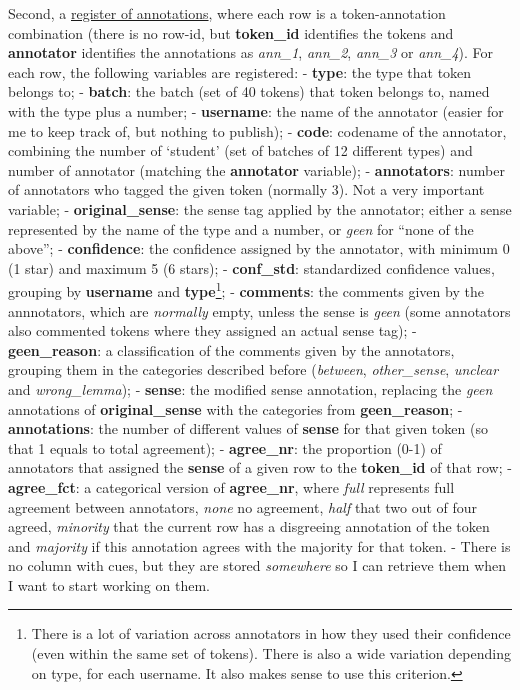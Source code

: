 \documentclass[
]{book}
\begin{document}
Second, a \href{C:/Users/u0118974/Box\%20Sync/Nederlands\%20wolken/Output/Merges/long_tokens.tsv}{register of annotations}, where each row is a token-annotation combination (there is no row-id, but \textbf{token\_id} identifies the tokens and \textbf{annotator} identifies the annotations as \emph{ann\_1}, \emph{ann\_2}, \emph{ann\_3} or \emph{ann\_4}). For each row, the following variables are registered:
- \textbf{type}: the type that token belongs to;
- \textbf{batch}: the batch (set of 40 tokens) that token belongs to, named with the type plus a number;
- \textbf{username}: the name of the annotator (easier for me to keep track of, but nothing to publish);
- \textbf{code}: codename of the annotator, combining the number of `student' (set of batches of 12 different types) and number of annotator (matching the \textbf{annotator} variable);
- \textbf{annotators}: number of annotators who tagged the given token (normally 3). Not a very important variable;
- \textbf{original\_sense}: the sense tag applied by the annotator; either a sense represented by the name of the type and a number, or \emph{geen} for ``none of the above'';
- \textbf{confidence}: the confidence assigned by the annotator, with minimum 0 (1 star) and maximum 5 (6 stars);
- \textbf{conf\_std}: standardized confidence values, grouping by \textbf{username} and \textbf{type}\footnote{There is a lot of variation across annotators in how they used their confidence (even within the same set of tokens). There is also a wide variation depending on type, for each username. It also makes sense to use this criterion.};
- \textbf{comments}: the comments given by the annnotators, which are \emph{normally} empty, unless the sense is \emph{geen} (some annotators also commented tokens where they assigned an actual sense tag);
- \textbf{geen\_reason}: a classification of the comments given by the annotators, grouping them in the categories described before (\emph{between}, \emph{other\_sense}, \emph{unclear} and \emph{wrong\_lemma});
- \textbf{sense}: the modified sense annotation, replacing the \emph{geen} annotations of \textbf{original\_sense} with the categories from \textbf{geen\_reason};
- \textbf{annotations}: the number of different values of \textbf{sense} for that given token (so that 1 equals to total agreement);
- \textbf{agree\_nr}: the proportion (0-1) of annotators that assigned the \textbf{sense} of a given row to the \textbf{token\_id} of that row;
- \textbf{agree\_fct}: a categorical version of \textbf{agree\_nr}, where \emph{full} represents full agreement between annotators, \emph{none} no agreement, \emph{half} that two out of four agreed, \emph{minority} that the current row has a disgreeing annotation of the token and \emph{majority} if this annotation agrees with the majority for that token.
- There is no column with cues, but they are stored \emph{somewhere} so I can retrieve them when I want to start working on them.
\end{document}
